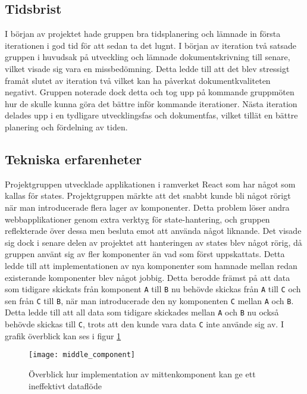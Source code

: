 \subsection{Tidsbrist}
I början av projektet hade gruppen bra tidsplanering och lämnade in första iterationen i god tid för att sedan ta det lugnt. I början av iteration två satsade gruppen i huvudsak på utveckling och lämnade dokumentskrivning till senare, vilket visade sig vara en missbedömning. Detta ledde till att det blev stressigt framåt slutet av iteration två vilket kan ha påverkat dokumentkvaliteten negativt. Gruppen noterade dock detta och tog upp på kommande gruppmöten hur de skulle kunna göra det bättre inför kommande iterationer. Nästa iteration delades upp i en tydligare utvecklingsfas och dokumentfas, vilket tillät en bättre planering och fördelning av tiden. 

\subsection{Tekniska erfarenheter}
Projektgruppen utvecklade applikationen i ramverket React som har något som kallas för states. Projektgruppen märkte att det snabbt kunde bli något rörigt när man introducerade flera lager av komponenter. Detta problem löser andra webbapplikationer genom extra verktyg för state-hantering, och gruppen reflekterade över dessa men besluta emot att använda något liknande. Det visade sig dock i senare delen av projektet att hanteringen av states blev något rörig, då gruppen använt sig av fler komponenter än vad som först uppskattats. Detta ledde till att implementationen av nya komponenter som hamnade mellan redan existerande komponenter blev något jobbig. Detta berodde främst på att data som tidigare skickats från komponent \texttt{A} till \texttt{B} nu behövde skickas från \texttt{A} till \texttt{C} och sen från \texttt{C} till \texttt{B}, när man introducerade den ny komponenten \texttt{C} mellan \texttt{A} och \texttt{B}. Detta ledde till att all data som tidigare skickades mellan \texttt{A} och \texttt{B} nu också behövde skickas till \texttt{C}, trots att den kunde vara data \texttt{C} inte använde sig av. I grafik överblick kan ses i figur \ref{fig:middle_component}

\begin{figure}[H]
    \centering
    \texttt{[image: middle\_component]}
    \caption{Överblick hur implementation av mittenkomponent kan ge ett ineffektivt dataflöde}
    \label{fig:middle_component}
\end{figure}




